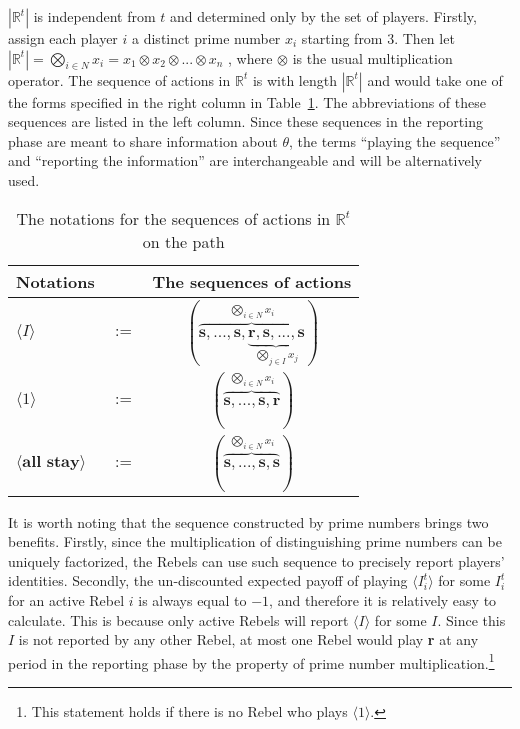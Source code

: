 \documentclass[12pt,letter]{article}
\newcommand{\Omicron}{\mathbb{R}}
\theoremstyle{definition}
\theoremstyle{remark}
\theoremstyle{claim}
\begin{document}
$|\Omicron^{t}|$ is independent from $t$ and determined only by the set of players. Firstly, assign each player $i$ a distinct prime number $x_i$ starting from $3$. Then let $|\Omicron^{t}|=\bigotimes_{i\in N} x_i=x_1\otimes x_2\otimes...\otimes x_n$ , where $\otimes$ is the usual multiplication operator. The sequence of actions in $\Omicron^{t}$ is with length $|\Omicron^t|$ and would take one of the forms specified in the right column in Table~\ref{Table_msg_form}. The abbreviations of these sequences are listed in the left column. Since these sequences in the reporting phase are meant to share information about $\theta$, the terms ``playing the sequence'' and ``reporting the information'' are interchangeable and will be alternatively used.


\begin{table}[!htbp]
\caption{The notations for the sequences of actions in $\Omicron^t$ on the path}
\label{Table_msg_form}
\begin{center}
\begin{tabular}{l c c}
Notations && The sequences of actions\\
\hline
\hline
$\langle  I \rangle$ 				& $:=$ 			& $(\overbrace{\textbf{s},...,\textbf{s},\underbrace{\textbf{r},\textbf{s},...,\textbf{s}}_{\bigotimes_{j\in I}x_j} }^{\bigotimes_{i\in N} x_i})$  \\
$\langle 1 \rangle$	 					& $:=$ 			& $( \overbrace{\textbf{s},...,\textbf{s},{\textbf{r}} }^{\bigotimes_{i\in N} x_i} )$  \\
$\langle \textbf{all stay} \rangle$	 					& $:=$ 			& $(\overbrace{ \textbf{s},...,\textbf{s},{\textbf{s}} }^{\bigotimes_{i\in N} x_i})$  \\
\hline
\end{tabular}
\end{center}
\end{table}


It is worth noting that the sequence constructed by prime numbers brings two benefits. Firstly, since the multiplication of distinguishing prime numbers can be uniquely factorized, the Rebels can use such sequence to precisely report players' identities. Secondly, the un-discounted expected payoff of playing $\langle I^t_i \rangle$ for some $I^t_i$ for an active Rebel $i$ is always equal to $-1$, and therefore it is relatively easy to calculate. This is because only active Rebels will report $\langle I \rangle$ for some $I$. Since this $I$ is not reported by any other Rebel, at most one Rebel would play \textbf{r} at any period in the reporting phase by the property of prime number multiplication.\footnote{This statement holds if there is no Rebel who plays $\langle 1 \rangle$.} 
\end{document}
